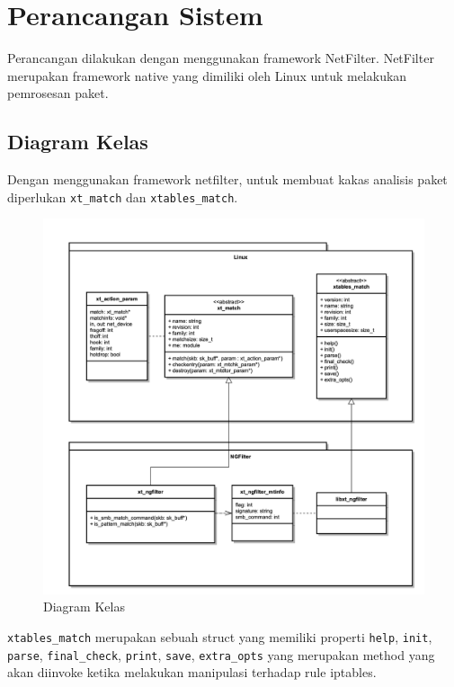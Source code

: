 \section{Perancangan Sistem}

Perancangan dilakukan dengan menggunakan framework NetFilter. NetFilter merupakan framework native yang dimiliki oleh Linux untuk melakukan pemrosesan paket.

\subsection{Diagram Kelas}

Dengan menggunakan framework netfilter, untuk membuat kakas analisis paket diperlukan \verb|xt_match| dan \verb|xtables_match|.

\begin{figure}[H]
	\centering
	\includegraphics[width=\textwidth]{resources/ngfilter_class_diagram.png}
	\caption{Diagram Kelas}
	\label{fig:class_diagram}
\end{figure}

\verb|xtables_match| merupakan sebuah struct yang memiliki properti \verb|help|, \verb|init|, \verb|parse|, \verb|final_check|, \verb|print|, \verb|save|, \verb|extra_opts| yang merupakan method yang akan diinvoke ketika melakukan manipulasi terhadap rule iptables.

